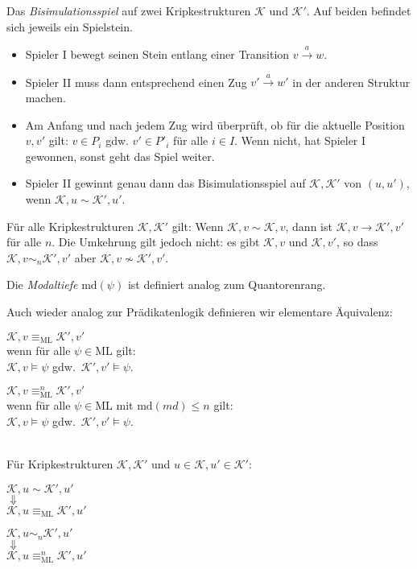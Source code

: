 \documentclass[a4paper,parskip=half*,DIV=15,fontsize=11pt]{scrartcl}
\newcommand{\K}{\mathcal{K}}
\newcommand{\ML}{\mathrm{ML}}
\begin{document}
Das \emph{Bisimulationsspiel} auf zwei Kripkestrukturen $\K$ und $\K'$.
Auf beiden befindet sich jeweils ein Spielstein.
\begin{itemize}
\item[] Spieler I bewegt seinen Stein entlang einer Transition $v \overset{a}{\to} w$.
\item[] Spieler II muss dann entsprechend einen Zug $v' \overset{a}{\to} w'$ in der anderen Struktur machen.
\item[] Am Anfang und nach jedem Zug wird überprüft, ob für die aktuelle Position $v, v'$ gilt: $v \in P_i$ gdw. $v' \in P'_i$ für alle $i \in I$. Wenn nicht, hat Spieler I gewonnen, sonst geht das Spiel weiter.
\item[] Spieler II gewinnt genau dann das Bisimulationsspiel auf $\K, \K'$ von $(u,u')$, wenn $\K, u \sim \K', u'$.
\end{itemize}


Für alle Kripkestrukturen $\K, \K'$ gilt: Wenn $\K, v \sim \K, v$, dann ist $\K, v \to \K', v'$ für alle $n$. Die Umkehrung gilt jedoch nicht: es gibt $\K, v$ und $\K, v'$, so dass $\K, v \sim_n \K', v'$ aber $\K, v \not\sim \K', v'$.

Die \emph{Modaltiefe} $\mathrm{md}(\psi)$ ist definiert analog zum Quantorenrang.

Auch wieder analog zur Prädikatenlogik definieren wir elementare Äquivalenz:

\begin{minipage}{0.4\textwidth}
\centering
$\K, v \equiv_\ML \K', v'$ \\
{\small wenn für alle $\psi \in \ML$ gilt: \\}
$\K, v \models \psi$ gdw.\ $\K', v' \models \psi$.
\end{minipage}\hspace{0.1\textwidth}
\begin{minipage}{0.4\textwidth}
\centering
$\K, v \equiv_\ML^n \K', v'$ \\
{\small wenn für alle $\psi \in \ML$ mit $\mathrm{md}(md) \leq n$ gilt: \\}
$\K, v \models \psi$ gdw.\ $\K', v' \models \psi$.
\end{minipage}
\ \\

Für Kripkestrukturen $\K, \K'$ und $u \in \K, u' \in \K'$:

\begin{minipage}{0.4\textwidth}
\centering
$\K, u \sim \K', u'$ \\
$\Downarrow$ \\
$\K, u \equiv_\ML \K', u'$
\end{minipage}\hspace{0.1\textwidth}
\begin{minipage}{0.4\textwidth}
\centering
$\K, u \sim_n \K', u'$ \\
$\Downarrow$ \\
$\K, u \equiv_\ML^n \K', u'$
\end{minipage}
\ \\
\end{document}
